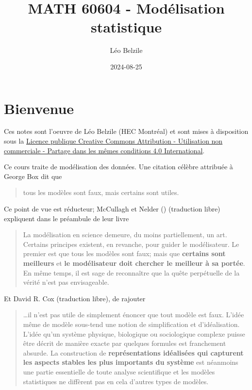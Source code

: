 \documentclass[
  11pt,
  letterpaper,
]{scrbook}
\title{MATH 60604 - Modélisation statistique}
\author{Léo Belzile}
\date{2024-08-25}
\renewcommand*\contentsname{Table des matières}
\newcommand\contentsname{Table des matières}
\theoremstyle{definition}
\theoremstyle{definition}
\theoremstyle{remark}
\begin{document}


\renewcommand*\contentsname{Table des matières}
{
\setcounter{tocdepth}{2}
\tableofcontents
}

\mainmatter
{}

\chapter*{Bienvenue}\label{bienvenue}


Ces notes sont l'oeuvre de Léo Belzile (HEC Montréal) et sont mises à
disposition sous la
\href{https://creativecommons.org/licenses/by-nc-sa/4.0/legalcode.fr}{Licence
publique Creative Commons Attribution - Utilisation non commerciale -
Partage dans les mêmes conditions 4.0 International}.

Ce cours traite de modélisation des données. Une citation célèbre
attribuée à George Box dit que

\begin{quote}
tous les modèles sont faux, mais certains sont utiles.
\end{quote}

Ce point de vue est réducteur; McCullagh et Nelder
() (traduction libre)
expliquent dans le préambule de leur livre

\begin{quote}
La modélisation en science demeure, du moins partiellement, un art.
Certains principes existent, en revanche, pour guider le modélisateur.
Le premier est que tous les modèles sont faux; mais que \textbf{certains
sont meilleurs} et \textbf{le modélisateur doit chercher le meilleur à
sa portée}. En même temps, il est sage de reconnaître que la quête
perpétuelle de la vérité n'est pas envisageable.
\end{quote}

Et David R. Cox (traduction libre), de rajouter

\begin{quote}
\ldots il n'est pas utile de simplement énoncer que tout modèle est
faux. L'idée même de modèle sous-tend une notion de simplification et
d'idéalisation. L'idée qu'un système physique, biologique ou
sociologique complexe puisse être décrit de manière exacte par quelques
formules est franchement absurde. La construction de
\textbf{représentations idéalisées qui capturent les aspects stables les
plus importants du système} est néanmoins une partie essentielle de
toute analyse scientifique et les modèles statistiques ne diffèrent pas
en cela d'autres types de modèles.
\end{quote}
\end{document}
